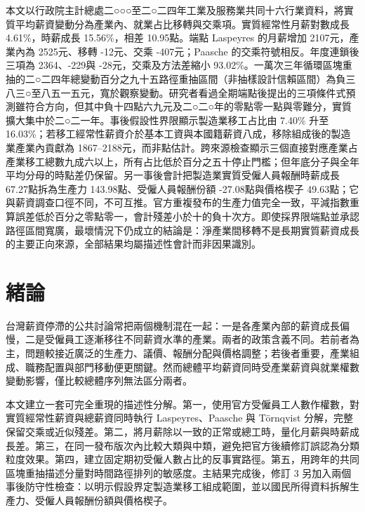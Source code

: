 \documentclass[12pt]{article}
\newcommand{\MainGrowth}{4.61}
\newcommand{\HourlyGrowth}{15.56}
\newcommand{\HoursGap}{10.95}
\newcommand{\MainWithin}{2525}
\newcommand{\MainShift}{-12}
\newcommand{\MainInteraction}{-407}
\newcommand{\MainTotal}{2107}
\newcommand{\ChainWithin}{2364}
\newcommand{\ChainShift}{-229}
\newcommand{\ChainInteraction}{-28}
\newcommand{\InteractionShrink}{93.02}
\newcommand{\MigrantShareStart}{7.40}
\newcommand{\MigrantShareEnd}{16.03}
\newcommand{\MigrantWithinLower}{1867}
\newcommand{\MigrantWithinUpper}{2188}
\newcommand{\MfgCompGrowth}{67.27}
\newcommand{\MfgProductivityGrowth}{143.98}
\newcommand{\MfgLaborShareGrowth}{-27.08}
\newcommand{\MfgPriceWedge}{49.63}
\begin{document}

\begin{wpabstract}
本文以行政院主計總處二○○○至二○二四年工業及服務業共同十六行業資料，將實質平均薪資變動分為產業內、就業占比移轉與交乘項。實質經常性月薪對數成長 \MainGrowth\%，時薪成長 \HourlyGrowth\%，相差 \HoursGap 點。端點 Laspeyres 的月薪增加 \MainTotal 元，產業內為 \MainWithin 元、移轉 \MainShift 元、交乘 \MainInteraction 元；Paasche 的交乘符號相反。年度連鎖後三項為 \ChainWithin、\ChainShift 與 \ChainInteraction 元，交乘及方法差縮小 \InteractionShrink\%。一萬次三年循環區塊重抽的二○二四年總變動百分之九十五路徑重抽區間（非抽樣設計信賴區間）為負三八三○至八五一五元，寬於觀察變動。研究者看過全期端點後提出的三項條件式預測雖符合方向，但其中負十四點六九元及二○二○年的零點零一點與零難分，實質擴大集中於二○二一年。事後假設性界限顯示製造業移工占比由 \MigrantShareStart\% 升至 \MigrantShareEnd\%；若移工經常性薪資介於基本工資與本國籍薪資八成，移除組成後的製造業產業內貢獻為 \MigrantWithinLower--\MigrantWithinUpper 元，而非點估計。跨來源檢查顯示三個直接對應產業占產業移工總數九成六以上，所有占比低於百分之五十停止門檻；但年底分子與全年平均分母的時點差仍保留。另一事後會計把製造業實質受僱人員報酬時薪成長 \MfgCompGrowth 點拆為生產力 \MfgProductivityGrowth 點、受僱人員報酬份額 \MfgLaborShareGrowth 點與價格楔子 \MfgPriceWedge 點；它與薪資調查口徑不同，不可互推。官方重複發布的生產力值完全一致，平減指數重算誤差低於百分之零點零一，會計殘差小於十的負十次方。即使採界限端點並承認路徑區間寬廣，最壞情況下仍成立的結論是：淨產業間移轉不是長期實質薪資成長的主要正向來源，全部結果均屬描述性會計而非因果識別。
\end{wpabstract}


\section{緒論}

台灣薪資停滯的公共討論常把兩個機制混在一起：一是各產業內部的薪資成長偏慢，二是受僱員工逐漸移往不同薪資水準的產業。兩者的政策含義不同。若前者為主，問題較接近廣泛的生產力、議價、報酬分配與價格調整；若後者重要，產業組成、職務配置與部門移動便更關鍵。然而總體平均薪資同時受產業薪資與就業權數變動影響，僅比較總體序列無法區分兩者。

本文建立一套可完全重現的描述性分解。第一，使用官方受僱員工人數作權數，對實質經常性薪資與總薪資同時執行 Laspeyres、Paasche 與 Törnqvist 分解，完整保留交乘或近似殘差。第二，將月薪除以一致的正常或總工時，量化月薪與時薪成長差。第三，在同一發布版次內比較大類與中類，避免把官方後續修訂誤認為分類粒度效果。第四，建立固定期初受僱人數占比的反事實路徑。第五，用跨年的共同區塊重抽描述分量對時間路徑排列的敏感度。主結果完成後，修訂 3 另加入兩個事後防守性檢查：以明示假設界定製造業移工組成範圍，並以國民所得資料拆解生產力、受僱人員報酬份額與價格楔子。
\end{document}

